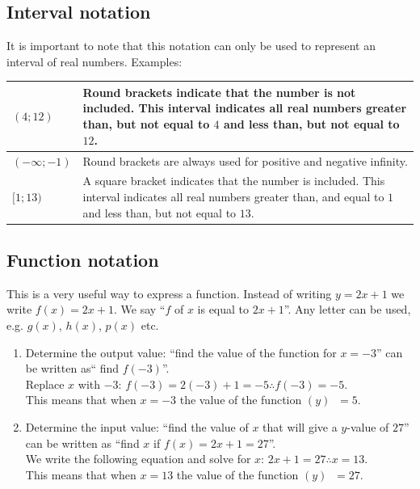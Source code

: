\subsection*{Interval notation}
It is important to note that this notation can only be used to represent an interval of real numbers.
Examples:
\\
\begin{tabular}{ |p{5cm} | p{8cm} | }
\hline
  $(4;12)$ &  Round brackets indicate that the number is not included. This interval indicates all real numbers greater than, but not equal to $4$ and less than, but not equal to $12$.
\\ \hline
 $(- \infty; -1)$ & Round brackets are always used for positive and negative infinity. 
\\ \hline
 $[1; 13)$ & A square bracket indicates that the number is included. This interval indicates all real numbers greater than, and equal to $1$ and less than, but not equal to $13$.
\\ \hline
\end{tabular}

\subsection*{Function notation}
This is a very useful way to express a function. Instead of writing $y=2x+1$ we write $f(x) = 2x+1$. We say ``$f$ of $x$ is equal to $2x+1$''. Any letter can be used, e.g. $g(x)$, $h(x)$, $p(x)$ etc. 
\begin{enumerate}[noitemsep, label=\textbf{\arabic*}. ] 
 \item Determine the output value: ``find the value of the function for $x=-3$'' can be written as`` find $f(-3)$''.
\\Replace $x$ with $-3$: $f(-3)=2(-3)+1=-5 \therefore f(-3)=-5$. \\
This means that when $x=-3$ the value of the function $(y)$ $~=5$.
\item Determine the input value: ``find the value of $x$ that will give a $y$-value of $27$'' can be written as ``find $x$ if $f(x)=2x+1 = 27$''. \\
We write the following equation and solve for $x$: $2x+1 = 27 \therefore x=13$.\\
This means that when $x=13$ the value of the function $(y)$ $~=27$.

\end{enumerate}

